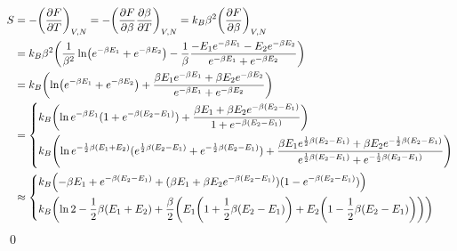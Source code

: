 \documentclass[uplatex,dvipdfmx,a4paper,11pt]{jlreq}
\makeatletter
\theoremstyle{definition}
\renewenvironment{proof}[1][\proofname]{\par
  \normalfont
  \topsep6\p@\@plus6\p@ \trivlist
  \item[\hskip\labelsep{\bfseries #1}\@addpunct{\bfseries}]\ignorespaces\quad\par
}{%
  \qed\endtrivlist\@endpefalse
}
\renewcommand\proofname{証明}
\makeatother
\begin{document}
\begin{proof}
\begin{align}
  \end{align}
  \begin{align}
    S & = - \qty(\pdv{F}{T})_{V,N} = - \qty(\pdv{F}{\beta}\pdv{\beta}{T})_{V,N} = k_B\beta^2\qty(\pdv{F}{\beta})_{V,N}                                                                                                                                                                                                                                                                         \\
      & = k_B\beta^2\qty(\frac{1}{\beta^2}\ln(e^{-\beta E_1} + e^{-\beta E_2}) - \frac{1}{\beta}\frac{-E_1e^{-\beta E_1} - E_2e^{-\beta E_2}}{e^{-\beta E_1} + e^{-\beta E_2}})                                                                                                                                                                                                                \\
      & = k_B\qty(\ln(e^{-\beta E_1} + e^{-\beta E_2}) + \frac{\beta E_1e^{-\beta E_1} + \beta E_2e^{-\beta E_2}}{e^{-\beta E_1} + e^{-\beta E_2}})                                                                                                                                                                                                                                            \\
      & = \begin{dcases}
            k_B\qty(\ln e^{-\beta E_1}(1 + e^{-\beta (E_2 - E_1)}) + \frac{\beta E_1 + \beta E_2e^{-\beta (E_2 - E_1)}}{1 + e^{-\beta (E_2 - E_1)}})                                                                                                                                                   \\
            k_B\qty(\ln e^{-\frac{1}{2}\beta (E_1 + E_2)}(e^{\frac{1}{2}\beta (E_2 - E_1)} + e^{-\frac{1}{2}\beta (E_2 - E_1)}) + \frac{\beta E_1e^{\frac{1}{2}\beta (E_2 - E_1)} + \beta E_2e^{-\frac{1}{2}\beta (E_2 - E_1)}}{e^{\frac{1}{2}\beta (E_2 - E_1)} + e^{-\frac{1}{2}\beta (E_2 - E_1)}}) \\
          \end{dcases} \\
      & \approx
    \begin{dcases}
      k_B\qty(-\beta E_1 + e^{-\beta (E_2 - E_1)} + (\beta E_1 + \beta E_2e^{-\beta (E_2 - E_1)})(1 - e^{-\beta (E_2 - E_1)}))                                   \\
      k_B\qty(\ln 2 - \frac{1}{2}\beta (E_1 + E_2) + \frac{\beta}{2}\qty(E_1\qty(1 + \frac{1}{2}\beta (E_2 - E_1)) + E_2\qty(1 - \frac{1}{2}\beta (E_2 - E_1)))) \\

\end{dcases}
\end{align}
\end{proof}
\end{document}
